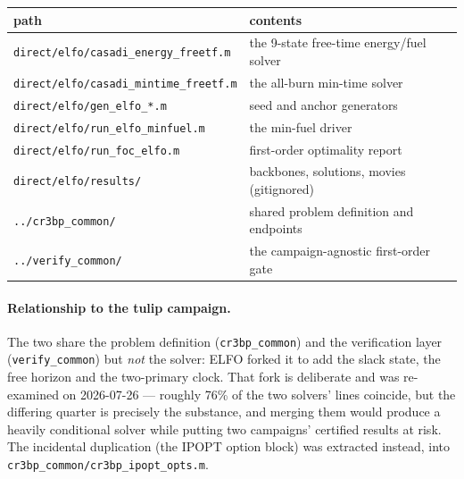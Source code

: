\documentclass[11pt]{article}
\newcommand{\file}[1]{\texttt{#1}}
\begin{document}
\begin{center}
\begin{tabular}{ll}
\toprule
path & contents \\
\midrule
\file{direct/elfo/casadi\_energy\_freetf.m} & the 9-state free-time energy/fuel solver \\
\file{direct/elfo/casadi\_mintime\_freetf.m} & the all-burn min-time solver \\
\file{direct/elfo/gen\_elfo\_*.m} & seed and anchor generators \\
\file{direct/elfo/run\_elfo\_minfuel.m} & the min-fuel driver \\
\file{direct/elfo/run\_foc\_elfo.m} & first-order optimality report \\
\file{direct/elfo/results/} & backbones, solutions, movies (gitignored) \\
\file{../cr3bp\_common/} & shared problem definition and endpoints \\
\file{../verify\_common/} & the campaign-agnostic first-order gate \\
\bottomrule
\end{tabular}
\end{center}

\paragraph{Relationship to the tulip campaign.} The two share the problem
definition (\file{cr3bp\_common}) and the verification layer
(\file{verify\_common}) but \emph{not} the solver: ELFO forked it to add the
slack state, the free horizon and the two-primary clock. That fork is
deliberate and was re-examined on 2026-07-26 --- roughly 76\% of the two
solvers' lines coincide, but the differing quarter is precisely the substance,
and merging them would produce a heavily conditional solver while putting two
campaigns' certified results at risk. The incidental duplication (the IPOPT
option block) was extracted instead, into
\file{cr3bp\_common/cr3bp\_ipopt\_opts.m}.
\end{document}
